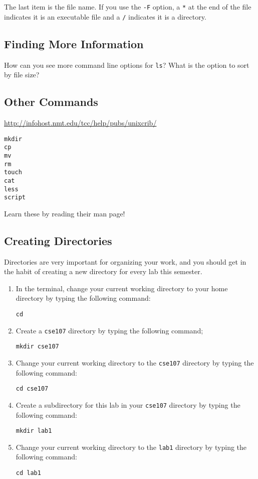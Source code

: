 \documentclass[11pt]{cselabheader}
\begin{document}
The last item is the file name. If you use the \texttt{-F} option, a \texttt{*}
at the end of the file indicates it is an executable file and a \texttt{/}
indicates it is a directory.

\subsection*{Finding More Information}

How can you see more command line options for \texttt{ls}? What is the option to
sort by file size?

\subsection{Other Commands}

\url{http://infohost.nmt.edu/tcc/help/pubs/unixcrib/}
\begin{lstlisting}[style=bash]
mkdir 
cp
mv
rm
touch
cat
less
script
\end{lstlisting}

Learn these by reading their man page!

\subsection{Creating Directories}
Directories are very important for organizing your work, and you should get in
the habit of creating a new directory for every lab this semester.

\begin{enumerate}

\item In the terminal, change your current working directory to your home
  directory by typing the following command:
\begin{lstlisting}[style=bash]
cd
\end{lstlisting}

\item Create a \texttt{cse107} directory by typing the following command;
\begin{lstlisting}[style=bash]
mkdir cse107
\end{lstlisting}

\item Change your current working directory to the \texttt{cse107} directory by
  typing the following command:
\begin{lstlisting}[style=bash]
cd cse107
\end{lstlisting}

\item Create a subdirectory for this lab in your \texttt{cse107} directory by
  typing the following command:
\begin{lstlisting}[style=bash]
mkdir lab1
\end{lstlisting}

\item Change your current working directory to the \texttt{lab1} directory by
  typing the following command:
\begin{lstlisting}[style=bash]
cd lab1
\end{lstlisting}

\end{enumerate}
\end{document}
